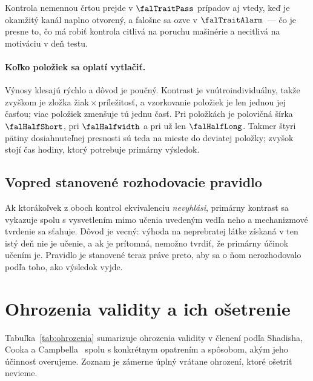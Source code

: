 Kontrola nemennou črtou prejde v $\falTraitPass$ prípadov aj vtedy, keď je okamžitý kanál naplno otvorený, a falošne sa ozve v $\falTraitAlarm$~--- čo je presne to, čo má robiť kontrola citlivá na poruchu mašinérie a necitlivá na motiváciu v deň testu.

\paragraph{Koľko položiek sa oplatí vytlačiť.} Výnosy klesajú rýchlo a dôvod je poučný. Kontrast je vnútroindividuálny, takže zvyškom je zložka žiak\,$\times$\,príležitosť, a vzorkovanie položiek je len jednou jej časťou; viac položiek zmenšuje tú jednu časť. Pri \falShortItems{} položkách je polovičná šírka $\falHalfShort$, pri \falPlacebo{} $\falHalfwidth$ a pri \falLongItems{} už len $\falHalfLong$. Takmer štyri pätiny dosiahnuteľnej presnosti sú teda na mieste do deviatej položky; zvyšok stojí čas hodiny, ktorý potrebuje primárny výsledok.

\subsection{Vopred stanovené rozhodovacie pravidlo}

Ak ktorákoľvek z oboch kontrol ekvivalenciu \emph{nevyhlási}, primárny kontrast sa vykazuje spolu s vysvetlením mimo učenia uvedeným vedľa neho a mechanizmové tvrdenie sa sťahuje. Dôvod je vecný: výhoda na neprebratej látke získaná v ten istý deň nie je učenie, a ak je prítomná, nemožno tvrdiť, že primárny účinok učením je. Pravidlo je stanovené teraz práve preto, aby sa o ňom nerozhodovalo podľa toho, ako výsledok vyjde.


\section{Ohrozenia validity a ich ošetrenie}
\label{sec:validita}

Tabuľka~\ref{tab:ohrozenia} sumarizuje ohrozenia validity v členení podľa Shadisha, Cooka a Campbella~\cite{shadish2002experimental} spolu s konkrétnym opatrením a spôsobom, akým jeho účinnosť overujeme. Zoznam je zámerne úplný vrátane ohrození, ktoré ošetriť nevieme.


